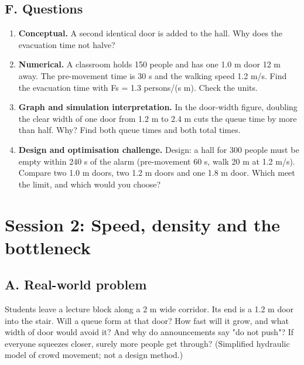 \documentclass[11pt,a4paper]{article}
\begin{document}
\subsection*{F. Questions}
\begin{enumerate}[nosep]
\item \textbf{Conceptual.} A second identical door is added to the hall. Why does the evacuation time not halve?
\item \textbf{Numerical.} A classroom holds 150 people and has one 1.0 m door 12 m away. The pre-movement time is 30 s and the walking speed 1.2 m/s. Find the evacuation time with Fs = 1.3 persons/(s m). Check the units.
\item \textbf{Graph and simulation interpretation.} In the door-width figure, doubling the clear width of one door from 1.2 m to 2.4 m cuts the queue time by more than half. Why? Find both queue times and both total times.
\item \textbf{Design and optimisation challenge.} Design: a hall for 300 people must be empty within 240 s of the alarm (pre-movement 60 s, walk 20 m at 1.2 m/s). Compare two 1.0 m doors, two 1.2 m doors and one 1.8 m door. Which meet the limit, and which would you choose?
\end{enumerate}

\section{Session 2: Speed, density and the bottleneck}

\subsection*{A. Real-world problem}
Students leave a lecture block along a 2 m wide corridor. Its end is a 1.2 m door into the stair. Will a queue form at that door? How fast will it grow, and what width of door would avoid it? And why do announcements say "do not push"? If everyone squeezes closer, surely more people get through? (Simplified hydraulic model of crowd movement; not a design method.)
\end{document}
